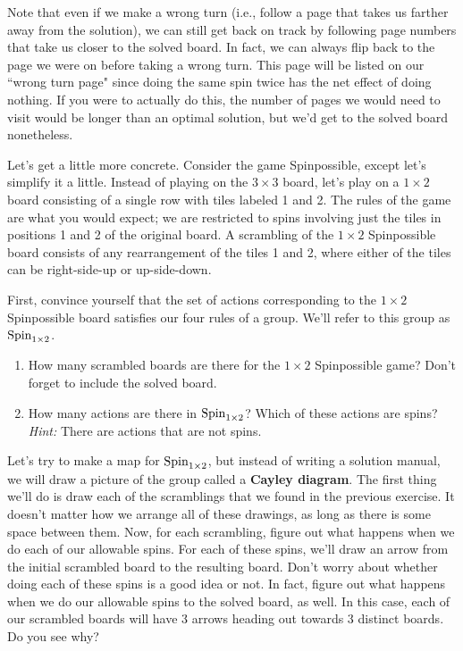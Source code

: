 Note that even if we make a wrong turn (i.e., follow a page that takes us farther away from the solution), we can still get back on track by following page numbers that take us closer to the solved board.  In fact, we can always flip back to the page we were on before taking a wrong turn.  This page will be listed on our ``wrong turn page" since doing the same spin twice has the net effect of doing nothing.  If you were to actually do this, the number of pages we would need to visit would be longer than an optimal solution, but we'd get to the solved board nonetheless.

Let's get a little more concrete.  Consider the game Spinpossible, except let's simplify it a little.  Instead of playing on the $3\times 3$ board, let's play on a $1\times 2$ board consisting of a single row with tiles labeled 1 and 2.  The rules of the game are what you would expect; we are restricted to spins involving just the tiles in positions 1 and 2 of the original board.  A scrambling of the $1\times 2$ Spinpossible board consists of any rearrangement of the tiles 1 and 2, where either of the tiles can be right-side-up or up-side-down.

\begin{exercise}
First, convince yourself that the set of actions corresponding to the $1\times 2$ Spinpossible board satisfies our four rules of a group. We'll refer to this group as $\operatorname{Spin}_{1\times 2}$.  
\begin{enumerate}[label=\rm{(\alph*)}]
\item How many scrambled boards are there for the $1\times 2$ Spinpossible game?  Don't forget to include the solved board.
\item How many actions are there in $\operatorname{Spin}_{1\times 2}$? Which of these actions are spins? \emph{Hint:} There are actions that are not spins.
\end{enumerate}
\end{exercise}

Let's try to make a map for $\operatorname{Spin}_{1\times 2}$, but instead of writing a solution manual, we will draw a picture of the group called a \textbf{Cayley diagram}.  The first thing we'll do is draw each of the scramblings that we found in the previous exercise.  It doesn't matter how we arrange all of these drawings, as long as there is some space between them.  Now, for each scrambling, figure out what happens when we do each of our allowable spins.  For each of these spins, we'll draw an arrow from the initial scrambled board to the resulting board.  Don't worry about whether doing each of these spins is a good idea or not.  In fact, figure out what happens when we do our allowable spins to the solved board, as well.  In this case, each of our scrambled boards will have 3 arrows heading out towards 3 distinct boards.  Do you see why?  

